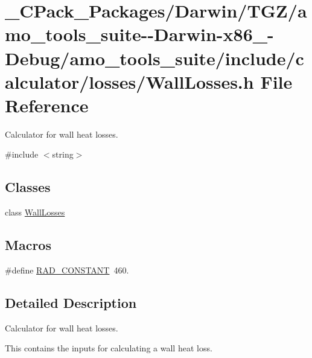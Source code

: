 \hypertarget{___c_pack___packages_2_darwin_2_t_g_z_2amo__tools__suite--_darwin-x86__64-_debug_2amo__tools__sub288642c1ba21dc25b0a9da5de3d037d}{}\section{\+\_\+\+C\+Pack\+\_\+\+Packages/\+Darwin/\+T\+G\+Z/amo\+\_\+tools\+\_\+suite-\/-\/\+Darwin-\/x86\+\_-\/\+Debug/amo\+\_\+tools\+\_\+suite/include/calculator/losses/\+Wall\+Losses.h File Reference}
\label{___c_pack___packages_2_darwin_2_t_g_z_2amo__tools__suite--_darwin-x86__64-_debug_2amo__tools__sub288642c1ba21dc25b0a9da5de3d037d}


Calculator for wall heat losses.  


{\ttfamily \#include $<$string$>$}\newline
\subsection*{Classes}
\begin{DoxyCompactItemize}
\item 
class \hyperlink{class_wall_losses}{Wall\+Losses}
\end{DoxyCompactItemize}
\subsection*{Macros}
\begin{DoxyCompactItemize}
\item 
\#define \hyperlink{___c_pack___packages_2_darwin_2_t_g_z_2amo__tools__suite--_darwin-x86__64-_debug_2amo__tools__sub288642c1ba21dc25b0a9da5de3d037d_ae9989856134afe2803a2e4c1e56dc7b8}{R\+A\+D\+\_\+\+C\+O\+N\+S\+T\+A\+NT}~460.
\end{DoxyCompactItemize}


\subsection{Detailed Description}
Calculator for wall heat losses. 

This contains the inputs for calculating a wall heat loss.

